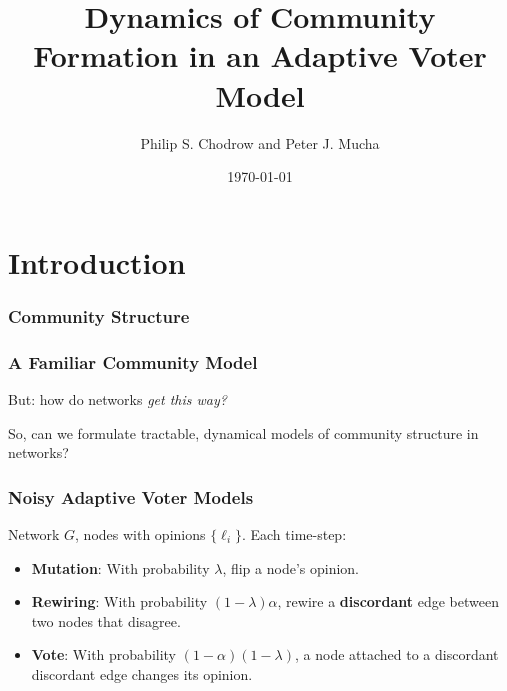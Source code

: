 \documentclass{beamer}
\title{Dynamics of Community Formation in an Adaptive Voter Model}
\date{\today}
\author{Philip S. Chodrow and Peter J. Mucha}
\institute{
	\vspace{6.4mm}
	$\vcenter{\hbox{\texttt{[image: mit\_logo]}}}$
	\hspace*{.2in}
	$\vcenter{\hbox{\texttt{[image: nsf\_logo]}}}$
}
\begin{document}
\maketitle

\section{Introduction}
		
		\begin{frame}\frametitle{Community Structure}
		  
		\end{frame}

		
		\begin{frame}\frametitle{A Familiar Community Model}
		  
			But: how do networks \emph{get this way?} 
		\end{frame}
	
		
		\begin{frame}[standout]
			So, can we formulate \alert{tractable}, \alert{dynamical} models of community structure in networks?
		\end{frame}
	
		
		\begin{frame}\frametitle{Noisy Adaptive Voter Models}
		  	Network $G$, nodes with opinions $\{\ell_i\}$. Each time-step:
		  	\begin{itemize}
		  		\item \textbf{Mutation}: With probability $\lambda$, flip a node's opinion.
		  		\item \textbf{Rewiring}: With probability $(1-\lambda)\alpha$, rewire a \textbf{discordant} edge between two nodes that disagree. 
		  		\item \textbf{Vote}: With probability $(1-\alpha)(1-\lambda)$, a node attached to a discordant discordant edge changes its opinion. 
		  	\end{itemize}
		\end{frame}
	
\end{document}
